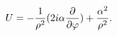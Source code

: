 \begin{equation}
U=-\frac{1}{\rho ^{2}}(2i\alpha \frac{\partial }{\partial \varphi })+\frac{%
\alpha ^{2}}{\rho ^{2}}.
\end{equation}

